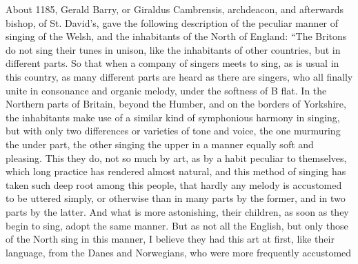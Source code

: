 About 1185, Gerald Barry, or Giraldus Cambrensis, 
archdeacon, and afterwards \pagebreak
bishop, of St. David’s, gave the following description of the peculiar manner 
of singing of the Welsh, and the inhabitants of the North of England: “The
Britons do not sing their tunes in unison, like the inhabitants of other countries,
but in different parts. So that when a company of singers meets to sing, as is
usual in this country, as many different parts are heard as there are singers, who
all finally unite in consonance and organic melody, under the softness of B flat. %
In the Northern parts of Britain, beyond the Humber, and on the borders of
Yorkshire, the inhabitants make use of a similar kind of symphonious harmony
in singing, but with only two differences or varieties of tone and voice, the one
murmuring the under part, the other singing the upper in a manner equally soft
and pleasing. This they do, not so much by art, as by a habit peculiar to themselves,
which long practice has rendered almost natural, and this method of singing
has taken such deep root among this people, that hardly any melody is accustomed
to be uttered simply, or otherwise than in many parts by the former, and in two
parts by the latter. And what is more astonishing, their children, as soon as they
begin to sing, adopt the same manner. But as not all the English, but only those
of the North sing in this manner, I believe they had this art at first, like their
language, from the Danes and Norwegians, who were more frequently accustomed
